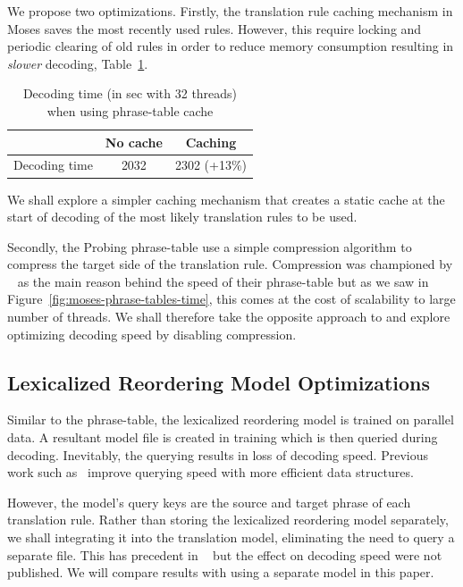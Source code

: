 \documentclass[11pt]{article}
\begin{document}
We propose two optimizations. Firstly, the translation rule caching mechanism in Moses saves the most recently used rules. However, this require locking and periodic clearing of old rules in order to reduce memory consumption resulting in \emph{slower} decoding, Table~\ref{tab:phrase-table-cache}. 
\begin{table}[h]
\small
\begin{center}
\begin{tabular}{|l|c|c|} \hline
		& No cache	& Caching \\ \hline
Decoding time  	& 2032 		& 2302 (+13\%) \\ \hline
\end{tabular}
\end{center}
\caption{Decoding time (in sec with 32 threads) when using phrase-table cache}
\label{tab:phrase-table-cache}
\end{table}

We shall explore a simpler caching mechanism that creates a static cache at the start of decoding of the most likely translation rules to be used.

Secondly, the Probing phrase-table use a simple compression algorithm to compress the target side of the translation rule. Compression was championed by ~ as the main reason behind the speed of their phrase-table but as we saw in Figure~\ref{fig:moses-phrase-tables-time}, this comes at the cost of scalability to large number of threads. We shall therefore take the opposite approach to and explore optimizing decoding speed by disabling compression.

\subsection{Lexicalized Reordering Model Optimizations}

Similar to the phrase-table, the lexicalized reordering model is trained on parallel data. A resultant model file is created in training which is then queried during decoding. Inevitably, the querying results in loss of decoding speed. Previous work such as~ improve querying speed with more efficient data structures.

However, the model's query keys are the source and target phrase of each translation rule. Rather than storing the lexicalized reordering model separately, we shall integrating it into the translation model, eliminating the need to query a separate file. This has precedent in ~ but the effect on decoding speed were not published. We will compare results with using a separate model in this paper.
\end{document}
